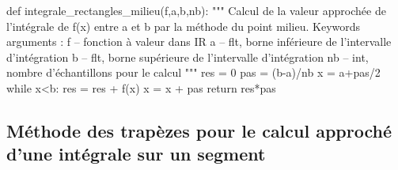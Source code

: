 \documentclass[10pt]{article}
\begin{document}
\begin{py}
\begin{python}
def integrale_rectangles_milieu(f,a,b,nb):
    """
    Calcul de la valeur approchée de l'intégrale de f(x) entre a et b par la méthode du point milieu.
    Keywords arguments :
    f -- fonction à valeur dans IR
    a -- flt, borne inférieure de l'intervalle d'intégration
    b -- flt, borne supérieure de l'intervalle d'intégration
    nb -- int, nombre d'échantillons pour le calcul
    """
    res = 0
    pas = (b-a)/nb
    x = a+pas/2
    while x<b:
        res = res + f(x)
        x = x + pas
    return res*pas
\end{python}
\end{py}

\subsection{Méthode des trapèzes pour le calcul approché d'une intégrale sur un segment}
\end{document}
